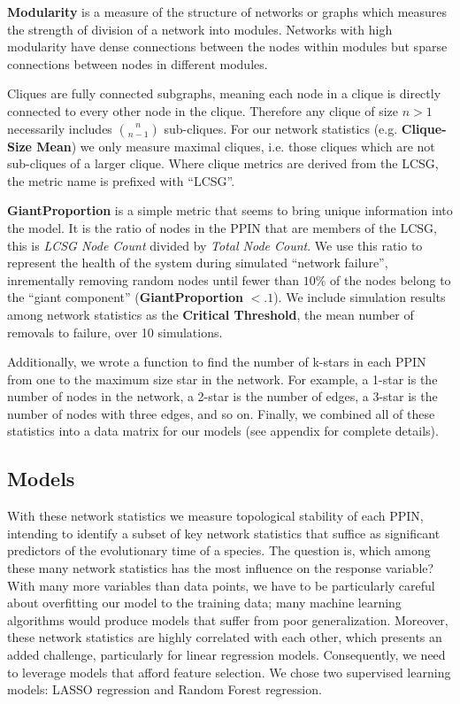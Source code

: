 \documentclass[12pt]{article}
\begin{document}
\textbf{Modularity} is a measure of the structure of networks or graphs which measures the strength of division of a network into modules. Networks with high modularity have dense connections between the nodes within modules but sparse connections between nodes in different modules.

Cliques are fully connected subgraphs, meaning each node in a clique is directly connected to every other node in the clique. Therefore any clique of size $n>1$ necessarily includes ${n \choose n-1}$ sub-cliques. For our network statistics (e.g. \textbf{Clique-Size Mean}) we only measure maximal cliques, i.e. those cliques which are not sub-cliques of a larger clique. Where clique metrics are derived from the LCSG, the metric name is prefixed with ``LCSG''.

\textbf{GiantProportion} is a simple metric that seems to bring unique information into the model. It is the ratio of nodes in the PPIN that are members of the LCSG, this is \textit{LCSG Node Count} divided by \textit{Total Node Count}. We use this ratio to represent the health of the system during simulated ``network failure'', inrementally removing random nodes until fewer than $10\%$ of the nodes belong to the ``giant component'' (\textbf{GiantProportion} $<.1$). We include simulation results among network statistics as the \textbf{Critical Threshold}, the mean number of removals to failure, over 10 simulations.

Additionally, we wrote a function to find the number of k-stars in each PPIN from one to the maximum size star in the network. For example, a 1-star is the number of nodes in the network, a 2-star is the number of edges, a 3-star is the number of nodes with three edges, and so on. Finally, we combined all of these statistics into a data matrix for our models (see appendix for complete details).

\subsection{Models}
With these network statistics we measure topological stability of each PPIN, intending to identify a subset of key network statistics that suffice as significant predictors of the evolutionary time of a species. The question is, which among these many network statistics has the most influence on the response variable? With many more variables than data points, we have to be particularly careful about overfitting our model to the training data; many machine learning algorithms would produce models that suffer from poor generalization. Moreover, these network statistics are highly correlated with each other, which presents an added challenge, particularly for linear regression models. Consequently, we need to leverage models that afford feature selection. We chose two supervised learning models: LASSO regression and Random Forest regression.
\end{document}
